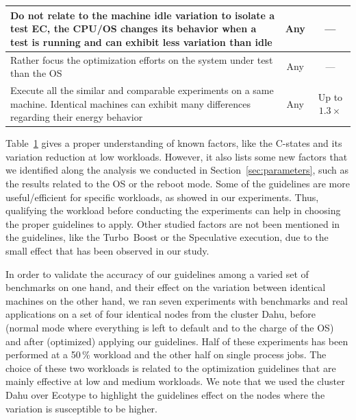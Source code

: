 \begin{table}[h!]
\begin{tabular}{|p{4.7cm}|c|c|}
        \hline
        Do not relate to the machine idle variation to isolate a test EC, the CPU/OS changes its behavior when a test is running and can exhibit less variation than idle & Any           & ---               \\
        \hline
        Rather focus the optimization efforts on the system under test than the OS                                                                                        & Any           & ---               \\
        \hline
        Execute all the similar and comparable experiments on a same machine. Identical machines can exhibit many differences regarding their energy behavior             & Any           & Up to $1.3\times$ \\
        \hline
    \end{tabular}
    \label{table:guidelines}
\end{table}

Table~\ref{table:guidelines} gives a proper understanding of known factors, like the C-states and its variation reduction at low workloads.
However, it also lists some new factors that we identified along the analysis we conducted in Section~\ref{sec:parameters}, such as the results related to the OS or the reboot mode.
Some of the guidelines are more useful/efficient for specific workloads, as showed in our experiments.
Thus, qualifying the workload before conducting the experiments can help in choosing the proper guidelines to apply.
Other studied factors are not been mentioned in the guidelines, like the Turbo~Boost or the Speculative execution, due to the small effect that has been observed in our study.

In order to validate the accuracy of our guidelines among a varied set of benchmarks on one hand, and their effect on the variation between identical machines on the other hand, we ran seven experiments with benchmarks and real applications on a set of four identical nodes from the cluster \textsf{Dahu}, before (\textsf{normal} mode where everything is left to default and to the charge of the OS) and after (\textsf{optimized}) applying our guidelines.
Half of these experiments has been performed at a 50\,\% workload and the other half on single process jobs.
The choice of these two workloads is related to the optimization guidelines that are mainly effective at low and medium workloads.
We note that we used the cluster \textsf{Dahu} over \textsf{Ecotype} to highlight the guidelines effect on the nodes where the variation is susceptible to be higher.


